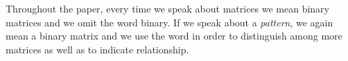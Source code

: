 \documentclass[12pt,a4paper]{report}
\begin{document}
\linenumbers

\newsavebox{\smlmat}
\newsavebox{\smlmatb}
\newsavebox{\smlmatc}

Throughout the paper, every time we speak about matrices we mean binary matrices and we omit the word binary. If we speak about a \emph{pattern}, we again mean a binary matrix and we use the word in order to distinguish among more matrices as well as to indicate relationship.
\end{document}
